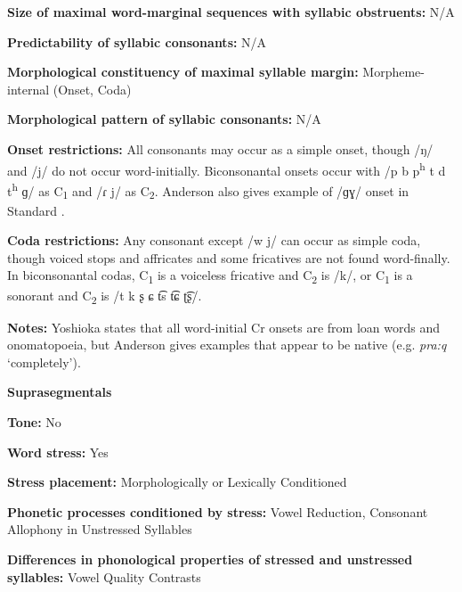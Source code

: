 \textbf{Size of maximal word{}-marginal sequences with syllabic obstruents:} N/A



\textbf{Predictability of syllabic consonants:} N/A



\textbf{Morphological constituency of maximal syllable margin:} Morpheme-internal (Onset, Coda)



\textbf{Morphological pattern of syllabic consonants:} N/A



\textbf{Onset restrictions:} All consonants may occur as a simple onset, though /ŋ/ and /j/ do not occur word-initially. Biconsonantal onsets occur with /p b p\textsuperscript{h} t d t\textsuperscript{h} ɡ/ as C\textsubscript{1} and /ɾ j/ as C\textsubscript{2}. Anderson also gives example of /ɡɣ/ onset in Standard .



\textbf{Coda restrictions:} Any consonant except /w j/ can occur as simple coda, though voiced stops and affricates and some fricatives are not found word-finally. In biconsonantal codas, C\textsubscript{1} is a voiceless fricative and C\textsubscript{2} is /k/, or C\textsubscript{1} is a sonorant and C\textsubscript{2} is /t k ʂ ɕ t͡s t͡ɕ ʈ͡ʂ/. 



\textbf{Notes:} Yoshioka states that all word-initial Cr onsets are from loan words and onomatopoeia, but Anderson gives examples that appear to be native (e.g. \textit{pra:q} ‘completely’).



\textbf{Suprasegmentals}



\textbf{Tone:} No



\textbf{Word stress:} Yes



\textbf{Stress placement:} Morphologically or Lexically Conditioned



\textbf{Phonetic processes conditioned by stress:} Vowel Reduction, Consonant Allophony in Unstressed Syllables



\textbf{Differences in phonological properties of stressed and unstressed syllables:} Vowel Quality Contrasts




